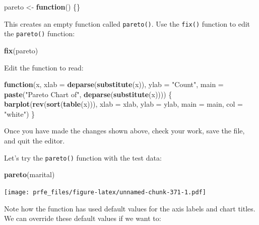 \documentclass[12pt,]{book}
\newenvironment{Shaded}{\begin{snugshade}}{\end{snugshade}}
\newcommand{\KeywordTok}[1]{\textcolor[rgb]{0.13,0.29,0.53}{\textbf{#1}}}
\newcommand{\DataTypeTok}[1]{\textcolor[rgb]{0.13,0.29,0.53}{#1}}
\newcommand{\StringTok}[1]{\textcolor[rgb]{0.31,0.60,0.02}{#1}}
\newcommand{\ControlFlowTok}[1]{\textcolor[rgb]{0.13,0.29,0.53}{\textbf{#1}}}
\newcommand{\NormalTok}[1]{#1}
\theoremstyle{definition}
\theoremstyle{definition}
\theoremstyle{definition}
\theoremstyle{remark}
\begin{document}
\begin{Shaded}
\begin{Highlighting}[]
\NormalTok{pareto <-}\StringTok{ }\ControlFlowTok{function}\NormalTok{() \{\}}
\end{Highlighting}
\end{Shaded}

This creates an empty function called \texttt{pareto()}. Use the
\texttt{fix()} function to edit the \texttt{pareto()} function:

\begin{Shaded}
\begin{Highlighting}[]
\KeywordTok{fix}\NormalTok{(pareto)}
\end{Highlighting}
\end{Shaded}

Edit the function to read:

\begin{Shaded}
\begin{Highlighting}[]
\ControlFlowTok{function}\NormalTok{(x,}
         \DataTypeTok{xlab =} \KeywordTok{deparse}\NormalTok{(}\KeywordTok{substitute}\NormalTok{(x)),}
         \DataTypeTok{ylab =} \StringTok{"Count"}\NormalTok{,}
         \DataTypeTok{main =} \KeywordTok{paste}\NormalTok{(}\StringTok{"Pareto Chart of"}\NormalTok{, }\KeywordTok{deparse}\NormalTok{(}\KeywordTok{substitute}\NormalTok{(x)))) \{}
  \KeywordTok{barplot}\NormalTok{(}\KeywordTok{rev}\NormalTok{(}\KeywordTok{sort}\NormalTok{(}\KeywordTok{table}\NormalTok{(x))),}
          \DataTypeTok{xlab =}\NormalTok{ xlab,}
          \DataTypeTok{ylab =}\NormalTok{ ylab,}
          \DataTypeTok{main =}\NormalTok{ main,}
          \DataTypeTok{col =} \StringTok{"white"}\NormalTok{)}
\NormalTok{\}}
\end{Highlighting}
\end{Shaded}

Once you have made the changes shown above, check your work, save the
file, and quit the editor.

Let's try the \texttt{pareto()} function with the test data:

\begin{Shaded}
\begin{Highlighting}[]
\KeywordTok{pareto}\NormalTok{(marital)}
\end{Highlighting}
\end{Shaded}

\texttt{[image: prfe\_files/figure-latex/unnamed-chunk-371-1.pdf]}

Note how the function has used default values for the axis labels and
chart titles. We can override these default values if we want to:
\end{document}
